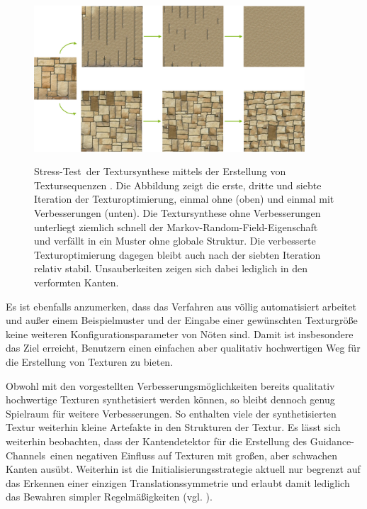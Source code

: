 \begin{figure}[h]
	\centering
	\includegraphics[width=0.9\textwidth]{images/textur-sequence-1}
	\label{textursequenzen}
	\caption{
	\glqq Stress-Test\grqq \ der Textursynthese mittels der Erstellung von Textursequenzen \cite{SelfTuning}.
	Die Abbildung zeigt die erste, dritte und siebte Iteration der Texturoptimierung, einmal ohne (oben) und einmal mit Verbesserungen (unten).
	Die Textursynthese ohne Verbesserungen unterliegt ziemlich schnell der \glqq Markov-Random-Field\grqq -Eigenschaft und verfällt in ein Muster ohne globale Struktur.
	Die verbesserte Texturoptimierung dagegen bleibt auch nach der siebten Iteration relativ stabil.
	Unsauberkeiten zeigen sich dabei lediglich in den verformten Kanten.
	}
\end{figure}

Es ist ebenfalls anzumerken, dass das Verfahren aus \cite{SelfTuning} völlig automatisiert arbeitet und außer einem Beispielmuster und der Eingabe einer gewünschten Texturgröße keine weiteren Konfigurationsparameter von Nöten sind.
Damit ist insbesondere das Ziel erreicht, Benutzern einen einfachen aber qualitativ hochwertigen Weg für die Erstellung von Texturen zu bieten.

Obwohl mit den vorgestellten Verbesserungsmöglichkeiten bereits qualitativ hochwertige Texturen synthetisiert werden können, so bleibt dennoch genug Spielraum für weitere Verbesserungen.
So enthalten viele der synthetisierten Textur weiterhin kleine Artefakte in den Strukturen der Textur.
Es lässt sich weiterhin beobachten, dass der Kantendetektor für die Erstellung des \glqq Guidance-Channels\grqq \ einen negativen Einfluss auf Texturen mit großen, aber schwachen Kanten ausübt.
Weiterhin ist die Initialisierungsstrategie aktuell nur begrenzt auf das Erkennen einer einzigen Translationssymmetrie und erlaubt damit lediglich das Bewahren simpler Regelmäßigkeiten (vgl. \cite{SelfTuning}).